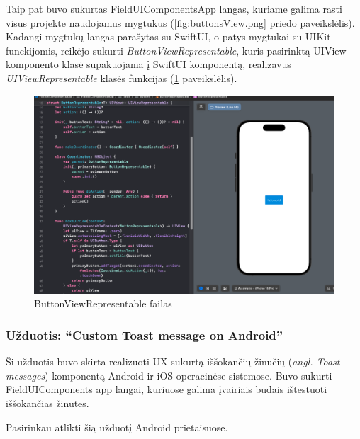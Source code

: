 Taip pat buvo sukurtas FieldUIComponentsApp langas, kuriame galima rasti visus projekte naudojamus mygtukus (\ref{fig:buttonsView.png} priedo paveikslėlis). Kadangi mygtukų langas parašytas su SwiftUI, o patys mygtukai su UIKit funckijomis, reikėjo sukurti \textit{ButtonViewRepresentable}, kuris pasirinktą UIView komponento klasė supakuojama į SwiftUI komponentą, realizavus \textit{UIViewRepresentable} klasės funkcijas (\ref{fig:buttonViewRepresentable} paveikslėlis).

\begin{figure} [htbp!]
    \centering
    \includegraphics[width=1\textwidth]{Images/iOSButtonRepresentable.png}
    \caption{ButtonViewRepresentable failas}
    \label{fig:buttonViewRepresentable}
\end{figure}

\newpage
\subsubsection{Užduotis: \enquote{Custom Toast message on Android}}
Ši užduotis buvo skirta realizuoti UX sukurtą iššokančių žinučių (\emph{angl. Toast messages}) komponentą Android ir iOS operacinėse sistemose. 
Buvo sukurti FieldUIComponents app langai, kuriuose galima įvairiais būdais ištestuoti iššokančias žinutes.

Pasirinkau atlikti šią užduotį Android prietaisuose. 

